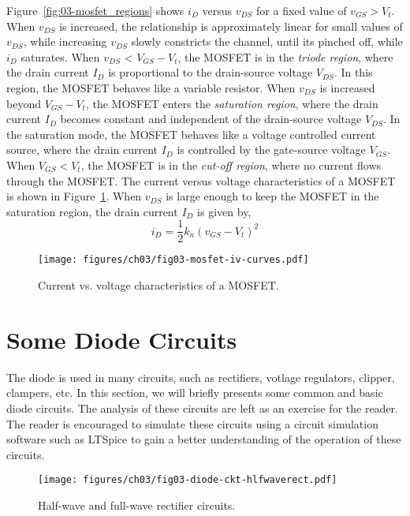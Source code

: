 Figure~\ref{fig:03-mosfet_regions} shows $i_D$ versus $v_{DS}$ for a fixed value of $v_{GS} > V_t$. When $v_{DS}$ is increased, the relationship is approximately linear for small values of $v_{DS}$, while increasing $v_{DS}$ slowly constricts the channel, until its pinched off, while $i_{D}$ saturates. When $v_{DS}$ < $V_{GS} - V_t$, the MOSFET is in the \textit{triode region}, where the drain current $I_D$ is proportional to the drain-source voltage $V_{DS}$. In this region, the MOSFET behaves like a variable resistor. When $v_{DS}$ is increased beyond $V_{GS} - V_t$, the MOSFET enters the \textit{saturation region}, where the drain current $I_D$ becomes constant and independent of the drain-source voltage $V_{DS}$. In the saturation mode, the MOSFET behaves like a voltage controlled current source, where the drain current $I_D$ is controlled by the gate-source voltage $V_{GS}$. When $V_{GS} < V_t$, the MOSFET is in the \textit{cut-off region}, where no current flows through the MOSFET. The current versus voltage characteristics of a MOSFET is shown in Figure~\ref{fig:03-mosfet-iv-curves}. When $v_{DS}$ is large enough to keep the MOSFET in the saturation region, the drain current $I_D$ is given by,
\begin{equation}
    i_D = \frac{1}{2}k_n\left(v_{GS} - V_t\right)^2
    \label{eq03-mosfet-id-sat}
\end{equation}

\begin{figure}[t]
    \centering
    \texttt{[image: figures/ch03/fig03-mosfet-iv-curves.pdf]}
    \caption{Current vs. voltage characteristics of a MOSFET.}
    \label{fig:03-mosfet-iv-curves}
\end{figure}

\section{Some Diode Circuits}
The diode is used in many circuits, such as rectifiers, votlage regulators, clipper, clampers, etc. In this section, we will briefly presents some common and basic diode circuits. The analysis of these circuits are left as an exercise for the reader. The reader is encouraged to simulate these circuits using a circuit simulation software such as LTSpice to gain a better understanding of the operation of these circuits.
\begin{figure}[b]
    \centering
    \texttt{[image: figures/ch03/fig03-diode-ckt-hlfwaverect.pdf]}
    \caption{Half-wave and full-wave rectifier circuits.}
    \label{fig:03-diode-ckt-hlfwaverect}
\end{figure}

